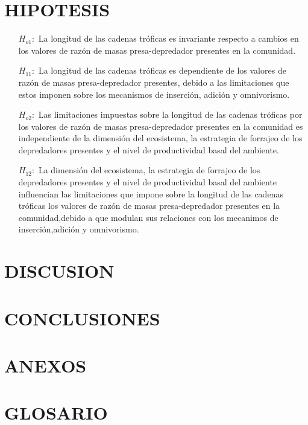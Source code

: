 \documentclass [12pt]{article}
\numberwithin{equation}{section}
\begin{document}
\section{HIPOTESIS}
\begin{itemize}
\item[$H_{o1}:$] La longitud de las cadenas tr\'oficas es invariante respecto a cambios en los valores de raz\'on de masas presa-depredador presentes en la comunidad.
\item[$H_{11}:$] La longitud de las cadenas tr\'oficas es dependiente de los valores de raz\'on de masas presa-depredador presentes, debido a las limitaciones que estos imponen sobre los mecanismos de inserci\'on, adici\'on y omnivorismo.

\item[$H_{o2}:$] Las limitaciones impuestas sobre la longitud de las cadenas tr\'oficas por los  valores de raz\'on de masas presa-depredador presentes en la comunidad es independiente de la dimensi\'on del ecosistema, la estrategia de forrajeo de los depredadores presentes y el nivel de productividad basal del ambiente.
\item[$H_{12}:$] La dimensi\'on del ecosistema, la estrategia de forrajeo de los depredadores presentes y el nivel de productividad basal del ambiente influencian las limitaciones que impone sobre la longitud de las cadenas tr\'oficas los valores de raz\'on de masas presa-depredador presentes en la comunidad,debido a que modulan sus relaciones con los mecanimos de inserci\'on,adici\'on y omnivorismo.

\end{itemize}






\section{DISCUSION}

\section{CONCLUSIONES}




\newpage
\section{ANEXOS}


\section{GLOSARIO}

\newpage
\listoftodos[Notes]
\end{document}
